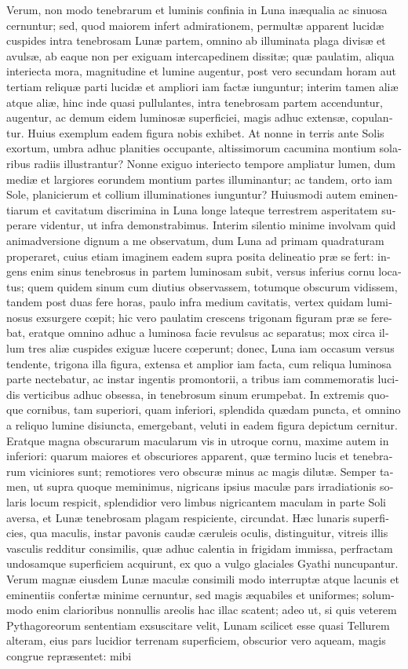 \documentclass[11pt,twoside,openany]{book}
\begin{document}
\begin{otherlanguage}{latin}
Verum, non modo tenebrarum et luminis confinia in Luna inæqualia ac sinuosa cernuntur; sed, quod maiorem infert admirationem, permultæ apparent lucidæ cuspides intra tenebrosam Lunæ partem, omnino ab illuminata plaga divisæ et avulsæ, ab eaque non per exiguam intercapedinem dissitæ; quæ paulatim, aliqua interiecta mora, magnitudine et lumine augentur, post vero secundam horam aut tertiam reliquæ parti lucidæ et ampliori iam factæ iunguntur; interim tamen aliæ atque aliæ, hinc inde quasi pullulantes, intra tenebrosam partem accenduntur, augentur, ac demum eidem luminosæ superficiei, magis adhuc extensæ, copulantur. Huius exemplum eadem figura nobis exhibet. At nonne in terris ante Solis exortum, umbra adhuc planities occupante, altissimorum cacumina montium solaribus radiis illustrantur? Nonne exiguo interiecto tempore ampliatur lumen, dum mediæ et largiores eorundem montium partes illuminantur; ac tandem, orto iam Sole, planicierum et collium illuminationes iunguntur? Huiusmodi autem eminentiarum et cavitatum discrimina in Luna longe lateque terrestrem asperitatem superare videntur, ut infra demonstrabimus. Interim silentio minime involvam quid animadversione dignum a me observatum, dum Luna ad primam quadraturam properaret, cuius etiam imaginem eadem supra posita delineatio præ se fert: ingens enim sinus tenebrosus in partem luminosam subit, versus inferius cornu locatus; quem quidem sinum cum diutius observassem, totumque obscurum vidissem, tandem post duas fere horas, paulo infra medium cavitatis, vertex quidam luminosus exsurgere cœpit; hic vero paulatim crescens trigonam figuram præ se ferebat, eratque omnino adhuc a luminosa facie revulsus ac separatus; mox circa illum tres aliæ cuspides exiguæ lucere cœperunt; donec, Luna iam occasum versus tendente, trigona illa figura, extensa et amplior iam facta, cum reliqua luminosa parte nectebatur, ac instar ingentis promontorii, a tribus iam commemoratis lucidis verticibus adhuc obsessa, in tenebrosum sinum erumpebat. In extremis quoque cornibus, tam superiori, quam inferiori, splendida quædam puncta, et omnino a reliquo lumine disiuncta, emergebant, veluti in eadem figura depictum cernitur. Eratque magna obscurarum macularum vis in utroque cornu, maxime autem in inferiori: quarum maiores et obscuriores apparent, quæ termino lucis et tenebrarum viciniores sunt; remotiores vero obscuræ minus ac magis dilutæ. Semper tamen, ut supra quoque meminimus, nigricans ipsius maculæ pars irradiationis solaris locum respicit, splendidior vero limbus nigricantem maculam in parte Soli aversa, et Lunæ tenebrosam plagam respiciente, circundat. Hæc lunaris superficies, qua maculis, instar pavonis caudæ cæruleis oculis, distinguitur, vitreis illis vasculis redditur consimilis, quæ adhuc calentia in frigidam immissa, perfractam undosamque superficiem acquirunt, ex quo a vulgo glaciales Gyathi nuncupantur. Verum magnæ eiusdem Lunæ maculæ consimili modo interruptæ atque lacunis et eminentiis confertæ minime cernuntur, sed magis æquabiles et uniformes; solummodo enim clarioribus nonnullis areolis hac illac scatent; adeo ut, si quis veterem Pythagoreorum sententiam exsuscitare velit, Lunam scilicet esse quasi Tellurem alteram, eius pars lucidior terrenam superficiem, obscurior vero aqueam, magis congrue repræsentet: mibi 
\end{otherlanguage}
\end{document}
